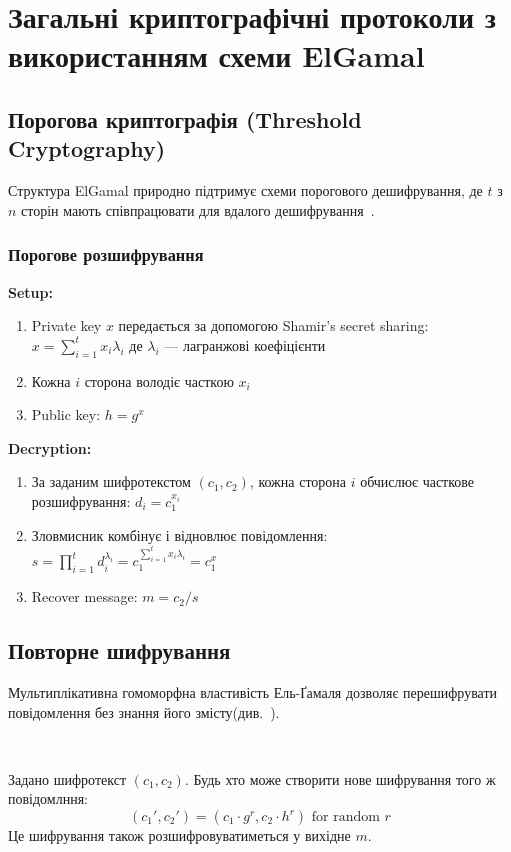 \section{Загальні криптографічні протоколи з використанням схеми ElGamal}

\subsection{Порогова криптографія (Threshold Cryptography)}

Структура ElGamal природно підтримує схеми порогового дешифрування, де $t$ з $n$ сторін мають співпрацювати для 
вдалого дешифрування~\cite{desmedt1994threshold}.

\subsubsection{Порогове розшифрування}

\textbf{Setup:}
\begin{enumerate}
    \item Private key $x$ передається за допомогою Shamir's secret sharing: $x = \sum\limits_{i=1}^t x_i \lambda_i$ 
        де $\lambda_i$ --- лагранжові коефіцієнти
    \item Кожна $i$ сторона володіє часткою $x_i$
    \item Public key: $h = g^x$
\end{enumerate}

\textbf{Decryption:}
\begin{enumerate}
    \item За заданим шифротекстом $(c_1, c_2)$, кожна сторона $i$ обчислює часткове розшифрування: $d_i = c_1^{x_i}$
    \item Зловмисник комбінує і відновлює повідомлення: $s = \prod_{i=1}^t d_i^{\lambda_i} = c_1^{\sum_{i=1}^t x_i \lambda_i} = c_1^x$
    \item Recover message: $m = c_2 / s$
\end{enumerate}

\subsection{Повторне шифрування}

Мультиплікативна гомоморфна властивість Ель-Ґамаля дозволяє перешифрувати повідомлення без знання його змісту(див.~\cite{chaum1981untraceable}).

\begin{proposition}
    ~\par Задано шифротекст $(c_1, c_2)$. Будь хто може створити нове шифрування того ж повідомлння:
    \begin{equation*}
        (c_1', c_2') = (c_1 \cdot g^r, c_2 \cdot h^r) \text{ for random } r
    \end{equation*}
    Це шифрування також розшифровуватиметься у вихідне $m$.
\end{proposition}


